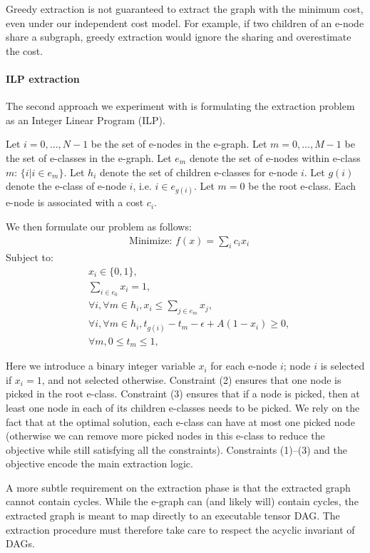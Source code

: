 Greedy extraction is not guaranteed to extract the graph with the minimum cost, even under our independent cost model.
For example, if two children of an e-node share a subgraph, greedy extraction would ignore the sharing and overestimate the cost.

\paragraph{ILP extraction}
The second approach we experiment with is formulating the extraction problem as an Integer Linear Program (ILP).

Let $i = 0, ..., N-1$ be the set of e-nodes in the e-graph.
Let $m = 0, ..., M-1$ be the set of e-classes in the e-graph.
Let $e_m$ denote the set of e-nodes within e-class $m$: $\{i | i\in e_m \}$.
Let $h_i$ denote the set of children e-classes for e-node $i$.
Let $g(i)$ denote the e-class of e-node $i$, i.e. $i\in e_{g(i)}$.
Let $m=0$ be the root e-class.
Each e-node is associated with a cost $c_i$.

We then formulate our problem as follows:
\begin{align*}
    &\textrm{Minimize: } f(x) = \sum_{i} c_i x_i
\end{align*}
Subject to:
\begin{align}
    &x_i \in \{0, 1\}, \\
    &\sum_{i\in e_0} x_i = 1, \\
    &\forall i, \forall m \in h_i, x_i \leq \sum_{j\in e_m} x_j , \\
    & \forall i, \forall m \in h_i, t_{g(i)} - t_m - \epsilon + A (1 - x_i) \geq 0, \\
    &\forall m, 0 \leq t_m \leq 1,
\end{align}

Here we introduce a binary integer variable $x_i$ for each e-node $i$; node $i$ is selected if $x_i=1$, and not selected otherwise.
Constraint (2) ensures that one node is picked in the root e-class.
Constraint (3) ensures that if a node is picked, then at least one node in each of its children e-classes needs to be picked.
We rely on the fact that at the optimal solution, each e-class can have at most one picked node (otherwise we can remove more picked nodes in this e-class to reduce the objective while still satisfying all the constraints).
Constraints (1)--(3) and the objective encode the main extraction logic.

A more subtle requirement on the extraction phase is that the extracted graph cannot contain cycles.
While the e-graph can (and likely will) contain cycles, the extracted graph is meant to map directly to an executable tensor DAG.
The extraction procedure must therefore take care to respect the acyclic invariant of DAGs.

